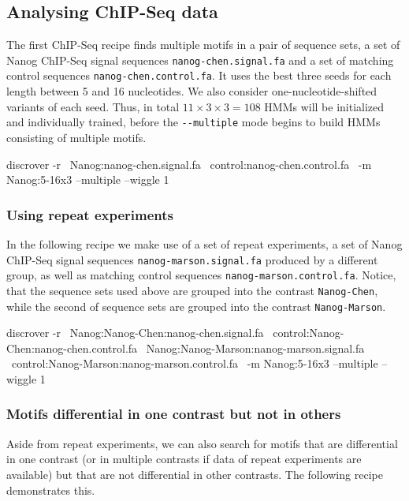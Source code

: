 \documentclass[a4paper]{article}
\begin{document}
\subsection{Analysing ChIP-Seq data}
The first ChIP-Seq recipe finds multiple motifs in a pair of sequence sets, a set of Nanog ChIP-Seq signal sequences \verb|nanog-chen.signal.fa| and a set of matching control sequences \verb|nanog-chen.control.fa|.
It uses the best three seeds for each length between 5 and 16 nucleotides.
We also consider one-nucleotide-shifted variants of each seed.
Thus, in total $11\times3\times3=108$ HMMs will be initialized and individually trained, before the \verb|--multiple| mode begins to build HMMs consisting of multiple motifs.
\\
\begin{verbbox}
discrover -r \
Nanog:nanog-chen.signal.fa \
control:nanog-chen.control.fa \
-m Nanog:5-16x3 --multiple --wiggle 1
\end{verbbox}
\fbox{\theverbbox[t]}

\subsubsection{Using repeat experiments}
In the following recipe we make use of a set of repeat experiments, a set of Nanog ChIP-Seq signal sequences \verb|nanog-marson.signal.fa| produced by a different group, as well as matching control sequences \verb|nanog-marson.control.fa|.
Notice, that the sequence sets used above are grouped into the contrast \verb|Nanog-Chen|, while the second of sequence sets are grouped into the contrast \verb|Nanog-Marson|.
\\
\begin{verbbox}
discrover -r \
Nanog:Nanog-Chen:nanog-chen.signal.fa \
control:Nanog-Chen:nanog-chen.control.fa \
Nanog:Nanog-Marson:nanog-marson.signal.fa \
control:Nanog-Marson:nanog-marson.control.fa \
-m Nanog:5-16x3 --multiple --wiggle 1
\end{verbbox}
\fbox{\theverbbox[t]}

\subsubsection{Motifs differential in one contrast but not in others}
Aside from repeat experiments, we can also search for motifs that are differential in one contrast (or in multiple contrasts if data of repeat experiments are available) but that are not differential in other contrasts.
The following recipe demonstrates this.
\end{document}
